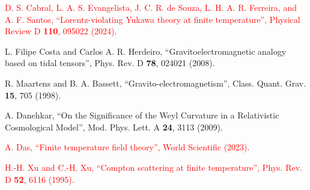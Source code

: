 \documentclass[11pt,showpacs,preprintnumbers,amsmath,amssymb,prd,nofootinbib,superscriptaddress]{revtex4-2}
\begin{document}
\begin{thebibliography}{100}
\textcolor{red}{ D. S. Cabral, L. A. S. Evangelista, J. C. R. de Souza, L. H. A. R. Ferreira, and A. F. Santos, ``Lorentz-violating Yukawa theory at finite temperature'',  {Physical Review D {\bf 110}, 095022 (2024).}}

 L. Filipe Costa and Carlos A. R. Herdeiro, ``Gravitoelectromagnetic analogy based on tidal tensors'',
 {Phys. Rev. D {\bf 78}, 024021 (2008). }

R. Maartens and B. A. Bassett, ``Gravito-electromagnetism'', 
 {Class. Quant. Grav. {\bf 15}, 705 (1998).}

 A. Danehkar, ``On the Significance of the Weyl Curvature in a Relativistic Cosmological Model'',
 {Mod. Phys. Lett. A {\bf 24}, 3113 (2009).}

\textcolor{red}{ A. Das, ``Finite temperature field theory'', \doi{} {World Scientific (2023).}}

\textcolor{red}{ H.-H. Xu and C.-H. Xu, ``Compton scattering at finite temperature'',  {Phys. Rev. D {\bf 52}, 6116 (1995).}}





\end{thebibliography}
\end{document}
